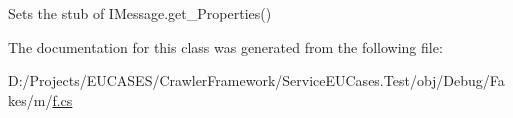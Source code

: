 Sets the stub of I\-Message.\-get\-\_\-\-Properties()



The documentation for this class was generated from the following file\-:\begin{DoxyCompactItemize}
\item 
D\-:/\-Projects/\-E\-U\-C\-A\-S\-E\-S/\-Crawler\-Framework/\-Service\-E\-U\-Cases.\-Test/obj/\-Debug/\-Fakes/m/\hyperlink{m_2f_8cs}{f.\-cs}\end{DoxyCompactItemize}
